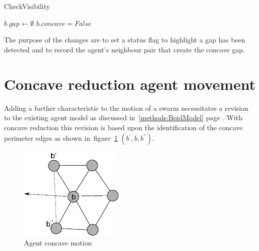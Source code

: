 \begin{algorithm}[H]
\DontPrintSemicolon
\SetAlgoLined
\caption{CheckVisibility}
$b.gap \leftarrow \emptyset$\;
$b.concave = False$\;
\label{algo:checkVisibility2}
\end{algorithm}

The purpose of the changes are to set a status flag to highlight a gap has been detected and to record the agent's neighbour pair that create the concave gap.

\section{Concave reduction agent movement}\label{concave:AgentMovement}
Adding a further characteristic to the motion of a swarm necessitates a revision to the existing agent model as discussed in~\autoref{methods:BoidModel} page \pageref{methods:BoidModel}. With concave reduction this revision is based upon the identification of the concave perimeter edges as shown in~figure~\ref{concave:VoidConcave1} $(b^{'},b,b^{''})$. 

\begin{figure}[H]
\begin{center}
\includegraphics[width=5cm]{CHAPTER-7/figures/VoidConcave1}
\end{center}
\caption{Agent concave motion\label{concave:VoidConcave1}}
\end{figure}

